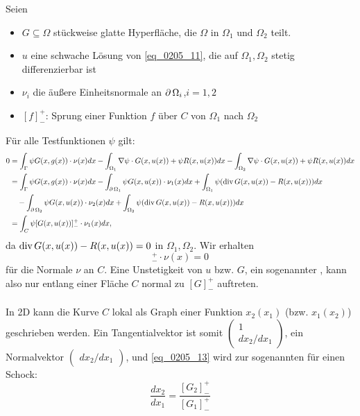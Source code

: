 	Seien
	\begin{itemize}
		\item $G \subseteq \Omega$ stückweise glatte Hyperfläche, die $\Omega$ in $\Omega_1$ und $\Omega_2$ teilt.
		\item $u$ eine schwache Lösung von \eqref{eq_0205_11}, die auf $\Omega_1,\Omega_2$ stetig differenzierbar ist
		\item $\nu_i$ die äußere Einheitsnormale an $\operatorname{\partial} \Omega_i$,$i=1,2$
		\item $[f]_-^+$: Sprung einer Funktion $f$ über $C$ von $\Omega_1$ nach $\Omega_2$
	\end{itemize}
	Für alle Testfunktionen $\psi$ gilt:
	\begin{equation}
	\begin{aligned}
		0 &= \int_\Gamma \psi G(x,g(x)) \cdot \nu(x)dx - \int_{\Omega_1} \nabla \psi \cdot G(x,u(x)) + \psi R(x,u(x)) dx - \int_{\Omega_2} \nabla \psi \cdot G(x,u(x)) + \psi R(x,u(x)) dx \\ \notag
		&= \int_{\Gamma} \psi G(x,g(x)) \cdot \nu(x) dx - \int_{\operatorname{\partial}\Omega_1} \psi G(x,u(x)) \cdot \nu_1(x) dx + \int_{\Omega_1} \psi (\operatorname{div} G(x,u(x)) - R(x,u(x))) dx \\
		&\quad - \int_{\operatorname{\partial}\Omega_2} \psi G(x,u(x)) \cdot \nu_2(x) dx + \int_{\Omega_2} \psi (\operatorname{div} G(x,u(x)) - R(x,u(x))) dx \\
		&= \int_C \psi[G(x,u(x))]_-^+ \cdot \nu_1(x) dx,
	\end{aligned}
	\end{equation}
	da $\operatorname{div} G(x,u(x)) - R(x,u(x)) = 0$ in $\Omega_1,\Omega_2$. Wir erhalten
	\begin{equation}
		[G(x,u(x))]_-^+ \cdot \nu(x) = 0 \label{eq_0205_13}
	\end{equation}
	für die Normale $\nu$ an $C$. Eine Unstetigkeit von $u$ bzw. $G$, ein sogenannter , kann also nur entlang einer Fläche $C$ normal zu $[G]_-^+$ auftreten. \\
	\mbox{} \\
	In 2D kann die Kurve $C$ lokal als Graph einer Funktion $x_2(x_1)$ (bzw. $x_1(x_2)$) geschrieben werden. Ein Tangentialvektor ist somit $\begin{pmatrix} 1 \\ dx_2/dx_1 \end{pmatrix}$, ein Normalvektor $\begin{pmatrix} dx_2/dx_1	\end{pmatrix}$, und \eqref{eq_0205_13} wird zur sogenannten   für einen Schock: 
	\begin{equation}
		\frac{dx_2}{dx_1} = \frac{[G_2]_-^+}{[G_1]_-^+} \label{eq_0205_14}
	\end{equation}
	

